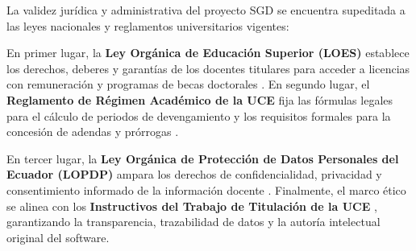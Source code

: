 La validez jurídica y administrativa del proyecto SGD se encuentra supeditada a las leyes nacionales y reglamentos universitarios vigentes:

En primer lugar, la \textbf{Ley Orgánica de Educación Superior (LOES)} establece los derechos, deberes y garantías de los docentes titulares para acceder a licencias con remuneración y programas de becas doctorales \cite{loes}. En segundo lugar, el \textbf{Reglamento de Régimen Académico de la UCE} fija las fórmulas legales para el cálculo de periodos de devengamiento y los requisitos formales para la concesión de adendas y prórrogas \cite{reglamento_uce}.

En tercer lugar, la \textbf{Ley Orgánica de Protección de Datos Personales del Ecuador (LOPDP)} ampara los derechos de confidencialidad, privacidad y consentimiento informado de la información docente \cite{lopdp_ecuador}. Finalmente, el marco ético se alinea con los \textbf{Instructivos del Trabajo de Titulación de la UCE} \cite{instructivo_titulacion}, garantizando la transparencia, trazabilidad de datos y la autoría intelectual original del software.
